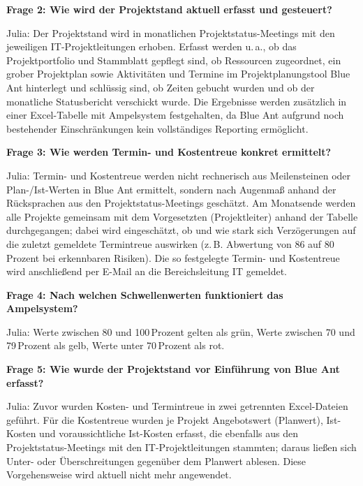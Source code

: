 \documentclass[
    12pt, 
    a4paper,
    ]{scrartcl} %
\begin{document}
\textbf{Frage 2: Wie wird der Projektstand aktuell erfasst und gesteuert?}

Julia: Der Projektstand wird in monatlichen Projektstatus-Meetings mit den jeweiligen IT-Projektleitungen erhoben. Erfasst werden u.\,a., ob das Projektportfolio und Stammblatt gepflegt sind, ob Ressourcen zugeordnet, ein grober Projektplan sowie Aktivitäten und Termine im Projektplanungstool Blue Ant hinterlegt und schlüssig sind, ob Zeiten gebucht wurden und ob der monatliche Statusbericht verschickt wurde. Die Ergebnisse werden zusätzlich in einer Excel-Tabelle mit Ampelsystem festgehalten, da Blue Ant aufgrund noch bestehender Einschränkungen kein vollständiges Reporting ermöglicht.

\textbf{Frage 3: Wie werden Termin- und Kostentreue konkret ermittelt?}

Julia: Termin- und Kostentreue werden nicht rechnerisch aus Meilensteinen oder Plan-/Ist-Werten in Blue Ant ermittelt, sondern nach Augenmaß anhand der Rücksprachen aus den Projektstatus-Meetings geschätzt. Am Monatsende werden alle Projekte gemeinsam mit dem Vorgesetzten (Projektleiter) anhand der Tabelle durchgegangen; dabei wird eingeschätzt, ob und wie stark sich Verzögerungen auf die zuletzt gemeldete Termintreue auswirken (z.\,B. Abwertung von 86 auf 80\,Prozent bei erkennbaren Risiken). Die so festgelegte Termin- und Kostentreue wird anschließend per E-Mail an die Bereichsleitung IT gemeldet.

\textbf{Frage 4: Nach welchen Schwellenwerten funktioniert das Ampelsystem?}

Julia: Werte zwischen 80 und 100\,Prozent gelten als grün, Werte zwischen 70 und 79\,Prozent als gelb, Werte unter 70\,Prozent als rot.

\bigskip
{}

\textbf{Frage 5: Wie wurde der Projektstand vor Einführung von Blue Ant erfasst?}

Julia: Zuvor wurden Kosten- und Termintreue in zwei getrennten Excel-Dateien geführt. Für die Kostentreue wurden je Projekt Angebotswert (Planwert), Ist-Kosten und voraussichtliche Ist-Kosten erfasst, die ebenfalls aus den Projektstatus-Meetings mit den IT-Projektleitungen stammten; daraus ließen sich Unter- oder Überschreitungen gegenüber dem Planwert ablesen. Diese Vorgehensweise wird aktuell nicht mehr angewendet.

\bigskip
{}
\end{document}
